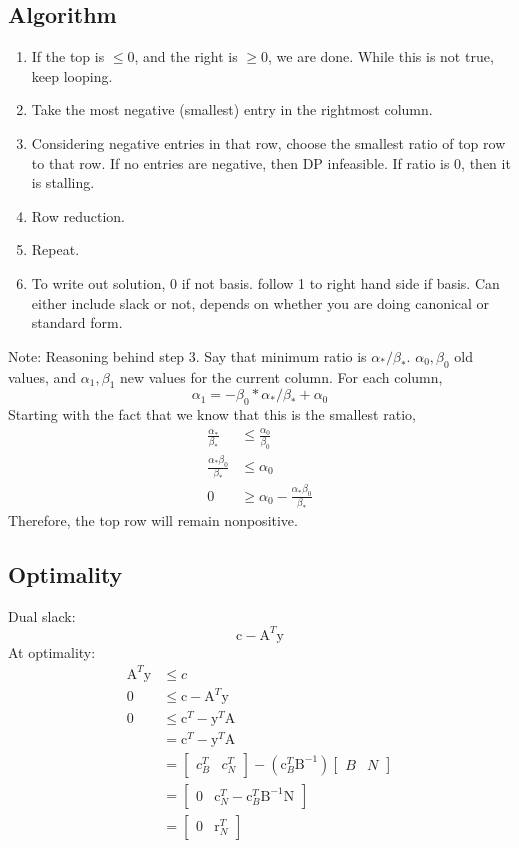 \documentclass[6pt]{article}
\def\y{\textrm{y}}
\def\c{\textrm{c}}
\def\r{\textrm{r}}
\def\A{\textrm{A}}
\def\N{\textrm{N}}
\def\B{\textrm{B}}
\begin{document}
\subsection{Algorithm}
\begin{enumerate}
    \item If the top is $\leq 0$, and the right is $\geq 0$, we are done. While this is not true, keep looping.
    \item Take the most negative (smallest) entry in the rightmost column.
    \item Considering negative entries in that row, choose the smallest ratio of top row to that row. If no entries are negative, then DP infeasible. If ratio is 0, then it is stalling.
    \item Row reduction.
    \item Repeat.
    \item To write out solution, 0 if not basis. follow 1 to right hand side if basis. Can either include slack or not, depends on whether you are doing canonical or standard form.
\end{enumerate}
Note: Reasoning behind step 3. Say that minimum ratio is $\alpha_*/\beta_*$. $\alpha_0, \beta_0$ old values, and $\alpha_1, \beta_1$ new values for the current column. For each column, $$\alpha_1 = -\beta_0*\alpha_*/\beta_* + \alpha_0$$
Starting with the fact that we know that this is the smallest ratio,
\begin{align*}
    \frac{\alpha_*}{\beta_*} &\leq \frac{\alpha_0}{\beta_0}\\
    \frac{\alpha_*\beta_0}{\beta_*} &\leq \alpha_0\\
    0 &\geq \alpha_0 - \frac{\alpha_* \beta_0}{\beta_*}
\end{align*}
Therefore, the top row will remain nonpositive.

\subsection{Optimality}
Dual slack:
$$\c-\A^T\y$$
At optimality:
\begin{align*}
    \A^T\y &\leq c\\
    0 &\leq \c - \A^T\y\\
    0 &\leq \c^T - \y^T\A\\
    &= \c^T - \y^T\A\\
    &= \begin{bmatrix}c_B^T & c_N^T\end{bmatrix} - (\c_B^{T}\B^{-1})\begin{bmatrix}B & N\end{bmatrix}\\
    &= \begin{bmatrix}0 & \c_N^T - \c_B^T\B^{-1}\N\end{bmatrix}\\
    &= \begin{bmatrix}0 & \r_N^T\end{bmatrix}
\end{align*}
\end{document}
